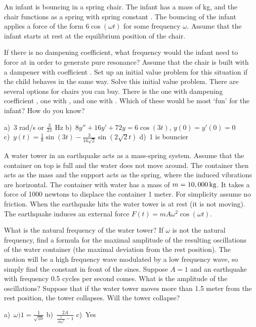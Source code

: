 \begin{exercise}
An infant is bouncing in a spring chair. The infant has a mass of \unit[8]{kg}, and the chair functions as a spring with spring constant . The bouncing of the infant applies a force of the form $6 \cos(\omega t)$ for some frequency $\omega$. Assume that the infant starts at rest at the equilibrium position of the chair.
\begin{tasks}
\task If there is no dampening coefficient, what frequency would the infant need to force at in order to generate pure resonance?
\task Assume that the chair is built with a dampener with coefficient . Set up an initial value problem for this situation if the child behaves in the same way.
\task Solve this initial value problem.
\task There are several options for chairs you can buy. There is the one with dampening coefficient , one with , and one with . Which of these would be most `fun' for the infant? How do you know?
\end{tasks}
\end{exercise}
\comboSol{%
}
{%
a)~$3$ rad/s or $\frac{3}{2\pi}$ Hz \quad b)~$8y'' + 16y' + 72y = 6\cos(3t)$, $y(0) = y'(0) = 0$ \\
c)~$y(t) = \frac{1}{8}\sin(3t) - \frac{3}{16\sqrt{2}}\sin(2\sqrt{2} t)$ \quad d)~1 is bouncier
}

\begin{exercise}
\pagebreak[3]
A water tower in an earthquake acts as a mass-spring system.
Assume that the container on top is full and the water does not move around.
The container then acts as the mass and the support acts as the spring, where
the induced vibrations are horizontal.  The container with water
has a mass of $m=\unit[10,000]{kg}$.  It takes a force of 1000 newtons
to displace the container 1 meter.  For simplicity assume no friction.
When the earthquake hits the water tower is at rest (it is not moving).
%
The earthquake induces an external force 
$F(t) = m A \omega^2 \cos (\omega t)$.
\begin{tasks}
\task
What is the natural frequency of the water tower?
\task
If $\omega$ is not the natural frequency, find a formula for the maximal
amplitude of the resulting oscillations of the water container (the maximal
deviation from the rest position).  The motion will be a high frequency wave
modulated by a low frequency wave, so simply find the constant in front of the
sines.
\task
Suppose $A = 1$ and an earthquake with frequency 0.5 cycles per second
comes.  What is the amplitude of the oscillations?  Suppose that if the water
tower moves more than 1.5 meter from the rest position, the tower collapses.
Will the tower collapse?
\end{tasks}
\end{exercise}
\comboSol{%
}
{%
a)~$\omega)1 = \frac{1}{\sqrt{10}}$ \quad b)~$\frac{2A}{\frac{1}{10\omega^2} - 1}$ \quad c)~Yes
}


